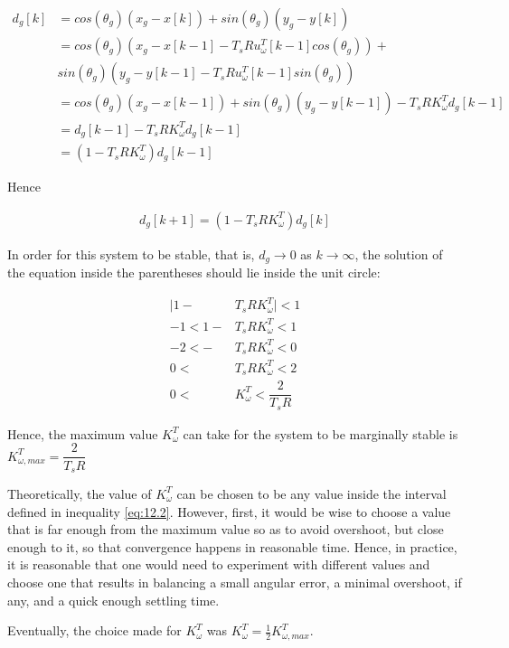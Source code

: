 \begin{align*}
  d_g[k] &= cos(\theta_g) (x_g - x[k]) + sin(\theta_g) (y_g - y[k]) \\
         &= cos(\theta_g) (x_g - x[k-1] - T_s R u_{\omega}^T[k-1] cos(\theta_g)) + \\
         &  sin(\theta_g) (y_g - y[k-1] - T_s R u_{\omega}^T[k-1] sin(\theta_g)) \\
         &= cos(\theta_g) (x_g - x[k-1]) + sin(\theta_g) (y_g - y[k-1]) -T_s R K_{\omega}^T d_g[k-1]  \\
         &= d_g[k-1] - T_s R K_{\omega}^T d_g[k-1]  \\
         &= (1-T_s R K_{\omega}^T)d_g[k-1]
\end{align*}

Hence

\begin{align*}
  d_g[k+1]= (1-T_s R K_{\omega}^T)d_g[k]
\end{align*}

In order for this system to be stable, that is, $d_g \to 0$ as $k \to \infty$,
the solution of the equation inside the parentheses should lie inside the unit
circle:

\begin{align}
  \Big|1 - &T_s R K_{\omega}^T\Big| < 1 \nonumber \\
  -1 < 1 - &T_s R K_{\omega}^T < 1 \nonumber \\
  -2 < - &T_s R K_{\omega}^T < 0 \nonumber \\
   0 <\ &T_s R K_{\omega}^T < 2 \nonumber \\
   0 <\ &K_{\omega}^T < \dfrac{2}{T_s R} \label{eq:12.2}
\end{align}

Hence, the maximum value $K_{\omega}^T$ can take for the system to be marginally
stable is $K_{\omega,max}^T = \dfrac{2}{T_s R}$

Theoretically, the value of $K_{\omega}^T$ can be chosen to be any value inside
the interval defined in inequality \ref{eq:12.2}. However, first, it would be
wise to choose a value that is far enough from the maximum value so as to avoid
overshoot, but close enough to it, so that convergence happens in reasonable
time. Hence, in practice, it is reasonable that one would need to experiment
with different values and choose one that results in balancing a small angular
error, a minimal overshoot, if any, and a quick enough settling time.

Eventually, the choice made for $K_{\omega}^T$ was
$K_{\omega}^T = \frac{1}{2} K_{\omega,max}^T$.
